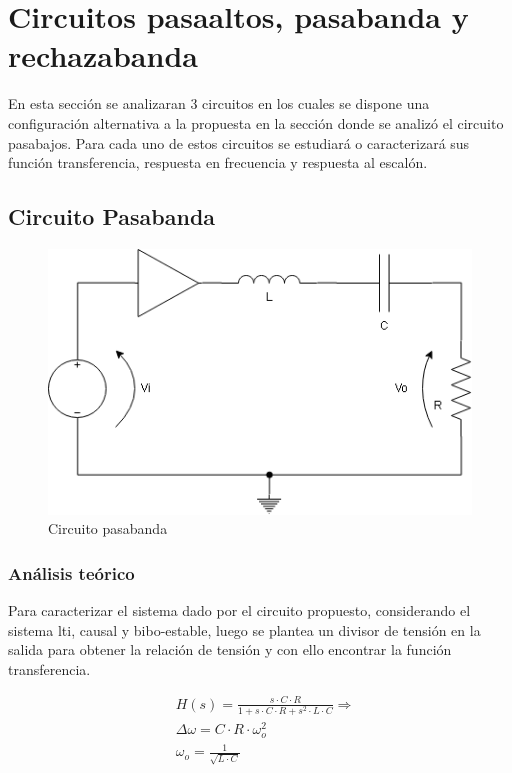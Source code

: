 \section{Circuitos pasaaltos, pasabanda y rechazabanda}
En esta secci\'on se analizaran 3 circuitos en los cuales se dispone una configuraci\'on alternativa a la propuesta
en la secci\'on donde se analiz\'o el circuito pasabajos. Para cada uno de estos circuitos se estudiar\'a o caracterizar\'a
sus funci\'on transferencia, respuesta en frecuencia y respuesta al escal\'on.

\subsection{Circuito Pasabanda}

\begin{figure}[H]
    \centering
    \includegraphics[scale=0.5]{Recursos/circuito_pasabanda.png}
    \caption{Circuito pasabanda}
    \label{fig:circuito_pasabanda}
\end{figure}

\subsubsection{An\'alisis te\'orico}
Para caracterizar el sistema dado por el circuito propuesto, considerando el sistema lti, causal y bibo-estable,
luego se plantea un divisor de tensi\'on en la salida para obtener la relaci\'on de tensi\'on y con ello encontrar la funci\'on
transferencia.

\begin{align*}
    & H(s) = \frac{s \cdot C \cdot R}{1 + s \cdot C \cdot R + s^{2} \cdot L \cdot C} \Rightarrow \\
    & \Delta \omega = C \cdot R \cdot \omega_o^{2} \\
    & \omega_o = \frac{1}{ \sqrt{L \cdot C} }
\end{align*}

